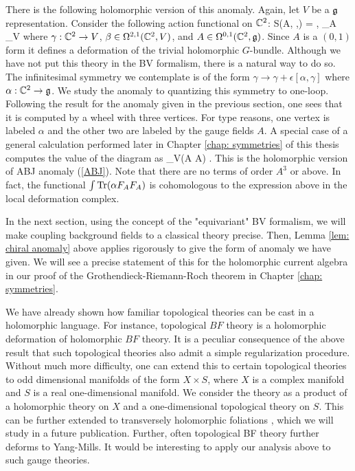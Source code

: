 There is the following holomorphic version of this anomaly. 
Again, let $V$ be a $\mathfrak g$ representation.
Consider the following action functional on $\mathbb C^2$:
\ben
S(A, \beta,\gamma) = \int \<\beta, \dbar_A \gamma\>_V
\een
where $\gamma : \mathbb C^2 \to V$, $\beta \in \Omega^{2,1}(\mathbb C^2 , V)$, and $A \in \Omega^{0,1}(\mathbb C^2, \mathfrak g)$. 
Since $A$ is a $(0,1)$ form it defines a deformation of the trivial holomorphic $G$-bundle. 
Although we have not put this theory in the BV formalism, there is a natural way to do so. 
The infinitesimal symmetry we contemplate is of the form $\gamma \to \gamma + \epsilon [\alpha, \gamma]$ where $\alpha : \mathbb C^2 \to \mathfrak g$. 
We study the anomaly to quantizing this symmetry to one-loop.
Following the result for the anomaly given in the previous section, one sees that it is computed by a wheel with three vertices. 
For type reasons, one vertex is labeled $\alpha$ and the other two are labeled by the gauge fields $A$.
A special case of a general calculation performed later in Chapter \ref{chap: symmetries} of this thesis computes the value of the diagram as
\ben
{}_V(\alpha \partial A \partial A) .
\een
This is the holomorphic version of ABJ anomaly (\ref{ABJ}). 
Note that there are no terms of order $A^3$ or above. 
In fact, the functional $\int {\rm Tr}(\alpha F_A F_A)$ is cohomologous to the expression above in the local deformation complex.

\begin{rmk} 
In the next section, using the concept of the "equivariant" BV formalism, we will make coupling background fields to a classical theory precise. 
Then, Lemma \ref{lem: chiral anomaly} above applies rigorously to give the form of anomaly we have given. 
We will see a precise statement of this for the holomorphic current algebra in our proof of the Grothendieck-Riemann-Roch theorem in Chapter \ref{chap: symmetries}.
\end{rmk}

\begin{rmk} 
We have already shown how familiar topological theories can be cast in a holomorphic language.
For instance, topological $BF$ theory is a holomorphic deformation of holomorphic $BF$ theory. 
It is a peculiar consequence of the above result that such topological theories also admit a simple regularization procedure. 
Without much more difficulty, one can extend this to certain topological theories to odd dimensional manifolds of the form $X \times S$, where $X$ is a complex manifold and $S$ is a real one-dimensional manifold. 
We consider the theory as a product of a holomorphic theory on $X$ and a one-dimensional topological theory on $S$. 
This can be further extended to transversely holomorphic foliations \cite{THF1,THF2}, which we will study in a future publication.
Further, often topological BF theory further deforms to Yang-Mills.
It would be interesting to apply our analysis above to such gauge theories. 
\end{rmk}


